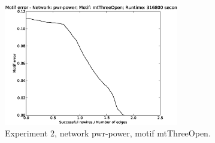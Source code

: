 \begin{figure}[p]
\centering
\includegraphics[width=3in]{Figures/motif_error-pwr-power-mtThreeOpen.eps}
\caption{Experiment 2, network pwr-power, motif mtThreeOpen.}
\label{fig:exp2-pwr-power-mtThreeOpen}
\end{figure}

